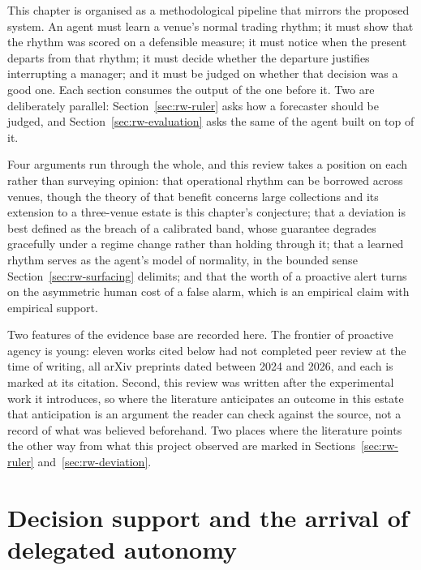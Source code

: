 This chapter is organised as a methodological pipeline that mirrors the proposed
system. An agent must learn a venue's normal trading rhythm; it must show that
the rhythm was scored on a defensible measure; it must notice when the present
departs from that rhythm; it must decide whether the departure justifies
interrupting a manager; and it must be judged on whether that decision was a good
one. Each section consumes the output of the one before it. Two are deliberately
parallel: Section~\ref{sec:rw-ruler} asks how a forecaster should be judged, and
Section~\ref{sec:rw-evaluation} asks the same of the agent built on top of it.

Four arguments run through the whole, and this review takes a position on each
rather than surveying opinion: that operational rhythm can be borrowed across
venues, though the theory of that benefit concerns large collections and its
extension to a three-venue estate is this chapter's conjecture; that a deviation
is best defined as the breach of a calibrated band, whose guarantee degrades
gracefully under a regime change rather than holding through it; that a learned
rhythm serves as the agent's model of normality, in the bounded sense
Section~\ref{sec:rw-surfacing} delimits; and that the worth of a proactive alert
turns on the asymmetric human cost of a false alarm, which is an empirical claim
with empirical support.

Two features of the evidence base are recorded here. The frontier of proactive
agency is young: eleven works cited below had not completed peer review at the
time of writing, all arXiv preprints dated between 2024 and 2026, and each is
marked at its citation. Second, this review was written after the experimental
work it introduces, so where the literature anticipates an outcome in this estate
that anticipation is an argument the reader can check against the source, not a
record of what was believed beforehand. Two places where the literature points
the other way from what this project observed are marked in
Sections~\ref{sec:rw-ruler} and~\ref{sec:rw-deviation}.

\section{Decision support and the arrival of delegated autonomy}
\label{sec:rw-framing}

